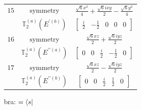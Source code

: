 \documentclass[fleqn,8pt,landscape]{jsarticle}
\begin{document}
\begin{longtable}{ccc}
$ 15 $ & $ \text{symmetry} $ & $ \frac{\sqrt{6} x^{2}}{4} + \frac{\sqrt{6} i x y}{2} - \frac{\sqrt{6} y^{2}}{4} $ \\
$  $ & $ \mathbb{T}_{2}^{(a)}(E^{\prime(b)}) $ & $ \begin{bmatrix} \frac{i}{2} & - \frac{1}{2} & 0 & 0 & 0 \end{bmatrix} $ \\ \hline
$ 16 $ & $ \text{symmetry} $ & $ \frac{\sqrt{6} x z}{2} + \frac{\sqrt{6} i y z}{2} $ \\
$  $ & $ \mathbb{T}_{2}^{(a)}(E^{\prime\prime(a)}) $ & $ \begin{bmatrix} 0 & 0 & \frac{i}{2} & - \frac{1}{2} & 0 \end{bmatrix} $ \\ \hline
$ 17 $ & $ \text{symmetry} $ & $ \frac{\sqrt{6} x z}{2} - \frac{\sqrt{6} i y z}{2} $ \\
$  $ & $ \mathbb{T}_{2}^{(a)}(E^{\prime\prime(b)}) $ & $ \begin{bmatrix} 0 & 0 & \frac{i}{2} & \frac{1}{2} & 0 \end{bmatrix} $ \\ \hline
\end{longtable}
bra: $=\bra{s}$
\end{document}

